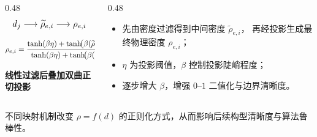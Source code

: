 \documentclass[notheorems]{beamer}
\begin{document}
\begin{frame}
{\begin{center}
\begin{tcolorbox}
{\begin{columns}[T, totalwidth=\linewidth]
\begin{column}{0.48\linewidth}
								\[
								\scalebox{1.05}{$\displaystyle
									d_j
									\longrightarrow
									\widetilde{\rho}_{e,i}
									\longrightarrow
									\rho_{e,i}
									$}
								\]
								
								\vspace{-1.0em}
								
								\[
								\scalebox{0.88}{$\displaystyle
									\rho_{e,i}
									=
									\frac{
										\tanh(\beta\eta)
										+
										\tanh\!\bigl(\beta(\widetilde{\rho}_{e,i}-\eta)\bigr)
									}{
										\tanh(\beta\eta)
										+
										\tanh\!\bigl(\beta(1-\eta)\bigr)
									}
									$}
								\]
								
								
								\begin{center}
									{\fontsize{8.0}{10.5}\selectfont\sffamily
										\textbf{线性过滤后叠加双曲正切投影}
									}
								\end{center}
							\end{column}
							
							\begin{column}{0.48\linewidth}
								\setlength{\leftmargini}{1.0em}
								\begin{itemize}
									\setlength{\itemsep}{5pt}
									\setlength{\topsep}{1pt}
									\setlength{\parsep}{0pt}
									\setlength{\parskip}{0pt}
									\item 先由密度过滤得到中间密度 $\widetilde{\rho}_{e,i}$，
									再经投影生成最终物理密度 $\rho_{e,i}$；
									\item $\eta$ 为投影阈值，$\beta$ 控制投影陡峭程度；
									\item 逐步增大 $\beta$，增强 $0$--$1$ 二值化与边界清晰度。
								\end{itemize}
							\end{column}
							
						\end{columns}
					}
				\end{tcolorbox}
			\end{center}
		}
		
		\begin{tcolorbox}[
			colback=structure.fg,
			colframe=structure.fg,
			coltext=white,
			boxrule=0.45pt,
			arc=3pt,
			left=7pt, right=7pt, top=3pt, bottom=3pt]
			\centering
			{\fontsize{7.8}{9.8}\selectfont\sffamily
				不同映射机制改变 $\rho=f(d)$ 的正则化方式，从而影响后续构型清晰度与算法鲁棒性。
			}
		\end{tcolorbox}
		
	\end{frame}
	
\end{document}
